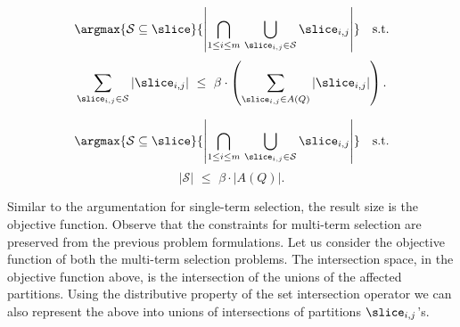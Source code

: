 \begin{definition}
\label{def:sbs_mts}
\begin{equation*}
  \argmax{\mathcal{S} \subseteq \slice}{\left| \bigcap_{1 \leq i \leq m}\,\bigcup_{\slice_{i,j} \in \mathcal{S}}{\slice_{i,j}} \right|} \quad \mbox{s.t.}  
\end{equation*}
\begin{equation*}
  \sum_{\slice_{i,j} \in \mathcal{S}} |\slice_{i,j}| \,\,\leq \,\,\beta \cdot \left(\sum_{\slice_{i,j} \in A(Q)}|\slice_{i,j}|\right).  
\end{equation*}

\end{definition}


\begin{definition}
\label{def:ecs_mts}
\begin{equation*}
  \argmax{\mathcal{S} \subseteq \slice}{\left| \bigcap_{1 \leq i \leq m}\,\bigcup_{\slice_{i,j} \in \mathcal{S}}{\slice_{i,j}} \right|} \quad \mbox{s.t.}  
\end{equation*}
\begin{equation*}
  |\mathcal{S}| \,\, \leq  \,\,\beta \cdot |A(Q)|.
\end{equation*}

\end{definition}



 Similar to the argumentation for single-term selection, the result size is the objective function. Observe that the constraints for multi-term selection are preserved from the previous problem formulations. Let us consider the objective function of both the multi-term selection problems. The intersection space, in the objective function above, is the intersection of the unions of the affected partitions. Using the distributive property of the set intersection operator we can also represent the above into unions of intersections of partitions $\slice_{i,j}$'s.


